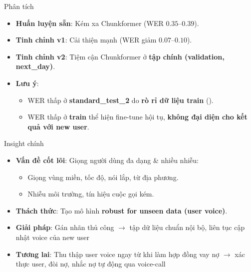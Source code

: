 \documentclass{beamer}
\begin{document}
\begin{frame}{Phân tích}
    \begin{itemize}
        \item \textbf{Huấn luyện sẵn}: Kém xa Chunkformer (WER $ 0.35$--$0.39$).
        \item \textbf{Tinh chỉnh v1}: Cải thiện mạnh (WER giảm $ 0.07$--$0.10$).
        \item \textbf{Tinh chỉnh v2}: Tiệm cận Chunkformer ở \textbf{tập chính (validation, next\_day)}.
        \item \textbf{Lưu ý}:
            \begin{itemize}
                \item WER thấp ở \textbf{standard\_test\_2} do \textbf{rò rỉ dữ liệu train} ().
                \item WER thấp ở \textbf{train} thể hiện fine-tune hội tụ, \textbf{không đại diện cho kết quả với new user}.
            \end{itemize}
    \end{itemize}
\end{frame}

\begin{frame}{Insight chính}
    \begin{itemize}
        \item \textbf{Vấn đề cốt lõi}: Giọng người dùng đa dạng \& nhiều nhiễu:
            \begin{itemize}
                \item Giọng vùng miền, tốc độ, nói lắp, từ địa phương.
                \item Nhiễu môi trường, tín hiệu cuộc gọi kém.
            \end{itemize}
        \item \textbf{Thách thức}: Tạo mô hình \textbf{robust for unseen data (user voice)}.
        \item \textbf{Giải pháp}: Gán nhãn thủ công $\to$ tập dữ liệu chuẩn nội bộ, liên tục cập nhật voice của new user 
        \item \textbf{Tương lai}: Thu thập user voice ngay từ khi làm hợp đồng vay nợ $\to$ xác thực user, đòi nợ, nhắc nợ tự động qua voice-call
    \end{itemize}
\end{frame}
\end{document}

